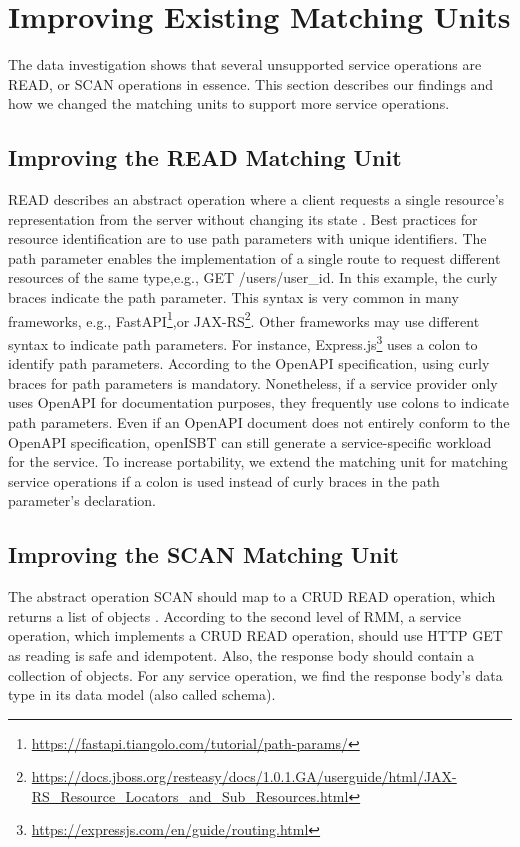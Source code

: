 \section{Improving Existing Matching Units}
\label{sec:extending:improving_existing_matching_units}

The data investigation shows that several unsupported service operations are READ, or SCAN operations in essence. This section describes our findings and how we changed the matching units to support more service operations.  

\subsection{Improving the READ Matching Unit}
READ describes an abstract operation where a client requests a single resource's representation from the server without changing its state \cite[][sec. 3]{paper_grambow_benchmarking_microservices}. Best practices for resource identification are to use path parameters with unique identifiers.
The path parameter enables the implementation of a single route to request different resources of the same type,e.g., GET /users/{user\_id}. In this example, the curly braces indicate the path parameter. This syntax is very common in many frameworks, e.g., FastAPI\footnote{\url{https://fastapi.tiangolo.com/tutorial/path-params/}},or JAX-RS\footnote{\url{https://docs.jboss.org/resteasy/docs/1.0.1.GA/userguide/html/JAX-RS_Resource_Locators_and_Sub_Resources.html}}. Other frameworks may use different syntax to indicate path parameters. For instance, Express.js\footnote{\url{https://expressjs.com/en/guide/routing.html}} uses a colon to identify path parameters. 
According to the OpenAPI specification, using curly braces for path parameters is mandatory.
Nonetheless, if a service provider only uses OpenAPI for documentation purposes, they frequently use colons to indicate path parameters. 
Even if an OpenAPI document does not entirely conform to the OpenAPI specification, openISBT can still generate a service-specific workload for the service. To increase portability, we extend the matching unit for matching service operations if a colon is used instead of curly braces in the path parameter's declaration.


\subsection{Improving the SCAN Matching Unit} 
The abstract operation SCAN should map to a CRUD READ operation, which returns a list of objects \cite[][sec. 3]{paper_grambow_benchmarking_microservices}. According to the second level of RMM, a service operation, which implements a CRUD READ operation, should use HTTP GET as reading is safe and idempotent. Also, the response body should contain a collection of objects.
For any service operation, we find the response body's data type in its data model (also called schema).


